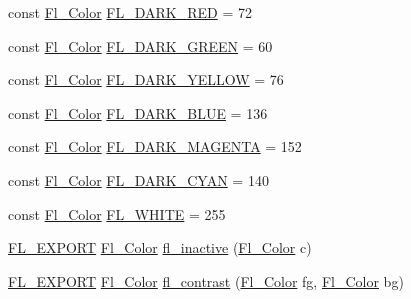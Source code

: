 \begin{DoxyCompactItemize}
\item 
const \hyperlink{_enumerations_8_h_a8b762953646f8abee866061f1af78a6a}{Fl\+\_\+\+Color} \hyperlink{_enumerations_8_h_a92460685e0e9d4709439cb5b43d28bff}{F\+L\+\_\+\+D\+A\+R\+K\+\_\+\+R\+ED} = 72
\item 
const \hyperlink{_enumerations_8_h_a8b762953646f8abee866061f1af78a6a}{Fl\+\_\+\+Color} \hyperlink{_enumerations_8_h_ae7d6f383011a292ae5c3f4973c4f8af6}{F\+L\+\_\+\+D\+A\+R\+K\+\_\+\+G\+R\+E\+EN} = 60
\item 
const \hyperlink{_enumerations_8_h_a8b762953646f8abee866061f1af78a6a}{Fl\+\_\+\+Color} \hyperlink{_enumerations_8_h_a76a49382967c90b30ef2af300665fbe3}{F\+L\+\_\+\+D\+A\+R\+K\+\_\+\+Y\+E\+L\+L\+OW} = 76
\item 
const \hyperlink{_enumerations_8_h_a8b762953646f8abee866061f1af78a6a}{Fl\+\_\+\+Color} \hyperlink{_enumerations_8_h_a963656bd3d000130e87dee9caf88fa79}{F\+L\+\_\+\+D\+A\+R\+K\+\_\+\+B\+L\+UE} = 136
\item 
const \hyperlink{_enumerations_8_h_a8b762953646f8abee866061f1af78a6a}{Fl\+\_\+\+Color} \hyperlink{_enumerations_8_h_a9342461dac15e3237bd33b3246599b28}{F\+L\+\_\+\+D\+A\+R\+K\+\_\+\+M\+A\+G\+E\+N\+TA} = 152
\item 
const \hyperlink{_enumerations_8_h_a8b762953646f8abee866061f1af78a6a}{Fl\+\_\+\+Color} \hyperlink{_enumerations_8_h_a511dfe6574e00219227f624004d90cf7}{F\+L\+\_\+\+D\+A\+R\+K\+\_\+\+C\+Y\+AN} = 140
\item 
const \hyperlink{_enumerations_8_h_a8b762953646f8abee866061f1af78a6a}{Fl\+\_\+\+Color} \hyperlink{_enumerations_8_h_ac1600c6c32be996f90f133cdc4135292}{F\+L\+\_\+\+W\+H\+I\+TE} = 255
\item 
\hyperlink{_fl___export_8_h_aa9ba29a18aee9d738370a06eeb4470fc}{F\+L\+\_\+\+E\+X\+P\+O\+RT} \hyperlink{_enumerations_8_h_a8b762953646f8abee866061f1af78a6a}{Fl\+\_\+\+Color} \hyperlink{_enumerations_8_h_ae8e47883ab1e3a6ee6b8ac3595e1eef3}{fl\+\_\+inactive} (\hyperlink{_enumerations_8_h_a8b762953646f8abee866061f1af78a6a}{Fl\+\_\+\+Color} c)
\item 
\hyperlink{_fl___export_8_h_aa9ba29a18aee9d738370a06eeb4470fc}{F\+L\+\_\+\+E\+X\+P\+O\+RT} \hyperlink{_enumerations_8_h_a8b762953646f8abee866061f1af78a6a}{Fl\+\_\+\+Color} \hyperlink{_enumerations_8_h_a4f5d2c8d4113f0af892f9ba232b24ec6}{fl\+\_\+contrast} (\hyperlink{_enumerations_8_h_a8b762953646f8abee866061f1af78a6a}{Fl\+\_\+\+Color} fg, \hyperlink{_enumerations_8_h_a8b762953646f8abee866061f1af78a6a}{Fl\+\_\+\+Color} bg)
\item 

\end{DoxyCompactItemize}
